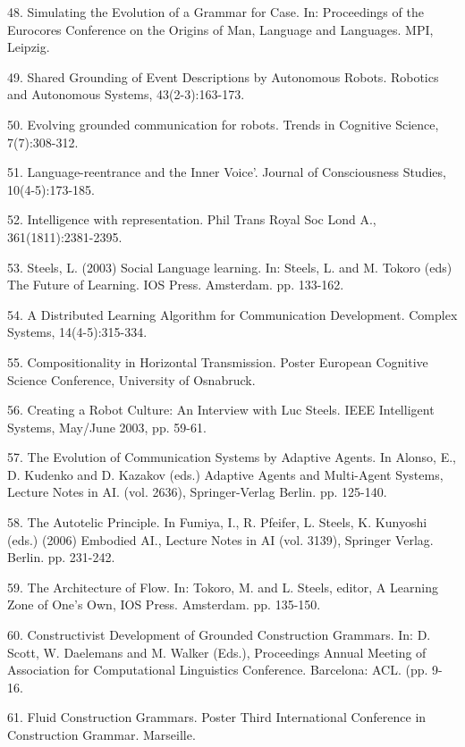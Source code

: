 48. \citet{Steels:02f} Simulating the Evolution of a Grammar for Case. In: Proceedings of the Eurocores Conference 
on the Origins of Man, Language and Languages. MPI, Leipzig.

49. \citet{Steels:03a} Shared Grounding of Event Descriptions by Autonomous Robots. 
Robotics and Autonomous Systems, 43(2-3):163-173.

50. \citet{steels:03b} Evolving grounded communication for robots. Trends in Cognitive Science, 7(7):308-312. 

51. \citet{Steels:03c} Language-reentrance and the Inner Voice'. Journal of Consciousness Studies, 10(4-5):173-185. 

52. \citet{Steels:03d} Intelligence with representation. Phil Trans Royal Soc Lond A., 361(1811):2381-2395.

53. \citet{Steels:03e} Steels, L. (2003) Social Language learning. In: Steels, L. and M. Tokoro (eds) The Future of Learning. 
IOS Press. Amsterdam. pp. 133-162. 

54. \citet{dejong:03f} A Distributed Learning Algorithm for Communication Development. 
Complex Systems, 14(4-5):315-334. 

55. \citet{Neubauer:03g}  Compositionality in Horizontal Transmission.  Poster European Cognitive Science Conference, 
University of Osnabruck. 

56. \citet{Manuel:03h} Creating a Robot Culture: An Interview with Luc Steels. IEEE Intelligent Systems, May/June 2003, pp. 59-61. 

57. \citet{steels:04a} The Evolution of Communication Systems by Adaptive Agents. In Alonso, E., D. Kudenko and D. Kazakov (eds.) Adaptive Agents and Multi-Agent Systems, Lecture Notes in AI. (vol. 2636), Springer-Verlag Berlin. pp. 125-140. 

58. \citet{Steels:04b} The Autotelic Principle. In Fumiya, I., R. Pfeifer, L. Steels, K. Kunyoshi (eds.) (2006) Embodied AI., Lecture Notes in AI (vol. 3139), Springer Verlag. Berlin. pp. 231-242. 

59. \citet{Steels:04c} The Architecture of Flow. In: Tokoro, M. and L. Steels, editor, A Learning Zone of One's Own, IOS Press. Amsterdam. 
pp. 135-150.

60. \citet{Steels:04d} Constructivist Development of Grounded Construction Grammars. In: D. Scott, W. Daelemans and M. Walker (Eds.), 
Proceedings Annual Meeting of Association for Computational Linguistics Conference. Barcelona: ACL. (pp. 9-16. 

61. \citet{Steels:04e} Fluid Construction Grammars. Poster Third International Conference in Construction Grammar. Marseille.  

